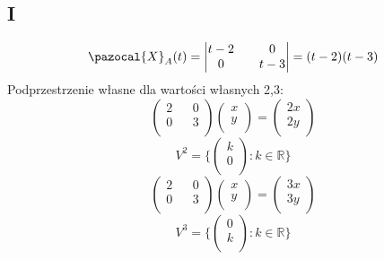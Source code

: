 \documentclass{article}
\begin{document}
\subsection*{I}
$$\pazocal{X}_A(t) = 
\begin{vmatrix}
t-2 && 0\\
0 && t-3\\
\end{vmatrix}
= (t-2)(t-3)
$$
Podprzestrzenie własne dla wartości własnych 2,3:
$$
\begin{pmatrix}
2 && 0\\
0 && 3\\
\end{pmatrix}
\begin{pmatrix}
x\\
y\\
\end{pmatrix} =
\begin{pmatrix}
2x\\
2y\\
\end{pmatrix}
$$
$$
V^2 = \{\begin{pmatrix}
k\\
0\\
\end{pmatrix} : k \in \mathbb{R}\}
$$
$$
\begin{pmatrix}
2 && 0\\
0 && 3\\
\end{pmatrix}
\begin{pmatrix}
x\\
y\\
\end{pmatrix} =
\begin{pmatrix}
3x\\
3y\\
\end{pmatrix}
$$
$$
V^3 = \{\begin{pmatrix}
0\\
k\\
\end{pmatrix} : k \in \mathbb{R}\}
$$
\end{document}
